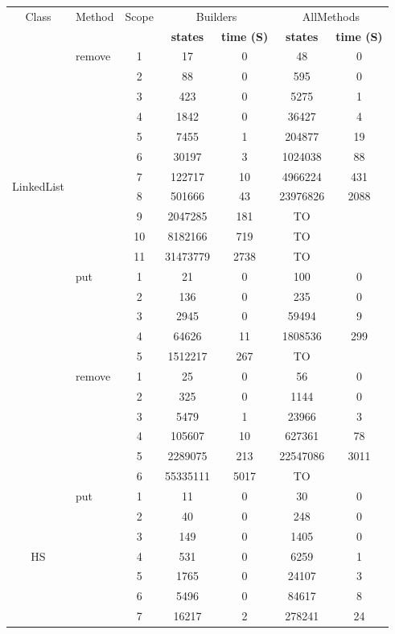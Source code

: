 \begin{table}[!thb]
\scriptsize
\begin{tabular}{ c| l| c c c c c}
\hline
Class & Method & Scope &
\multicolumn{2}{c}{\textsf{Builders}} &
\multicolumn{2}{c}{\textsf{AllMethods}} \\
&&&
\tiny{\textbf{states}} & \tiny{\textbf{time (S)}} &
\tiny{\textbf{states}} & \tiny{\textbf{time (S)} }\\
\hline
\multirow{14}{*}{LinkedList} 
& remove
  & 1 & 17  & 0 & 48  & 0 \\
& & 2 & 88  & 0 & 595 & 0 \\
& & 3 & 423 & 0 & 5275  & 1 \\
& & 4 & 1842  & 0 & 36427 & 4 \\
& & 5 & 7455  & 1 & 204877  & 19  \\
& & 6 & 30197 & 3 & 1024038 & 88  \\
& & 7 & 122717  & 10  & 4966224 & 431 \\
& & 8 & 501666  & 43  & 23976826  & 2088  \\
& & 9 & 2047285 & 181 & TO    \\
& & 10  & 8182166 & 719 &    TO  \\
& & 11  & 31473779  & 2738  &  TO     \\

\hline

\multirow{11}{*}{HM} 
& put
 & 1 & 21& 0& 100 & 0 \\
& & 2 & 136& 0& 235 & 0 \\
& & 3 & 2945& 0& 59494 & 9 \\
& & 4 & 64626& 11&  1808536& 299 \\
& & 5 & 1512217& 267& TO&  \\

 \cline{2-7}

& remove
 & 1 &25 & 0& 56 & 0 \\
& & 2 &325 & 0& 1144 &  0\\
& & 3 & 5479& 1& 23966 & 3 \\
& & 4 & 105607& 10& 627361 &  78\\
& & 5 & 2289075& 213& 22547086 &3011  \\
& & 6 & 55335111 & 5017&TO &  \\

\hline

\multirow{14}{*}{HS} 
& put
  & 1 & 11  & 0 & 30  & 0 \\
& & 2 & 40  & 0 & 248 & 0 \\
& & 3 & 149 & 0 & 1405  & 0 \\
& & 4 & 531 & 0 & 6259  & 1 \\
& & 5 & 1765  & 0 & 24107 & 3 \\
& & 6 & 5496  & 0 & 84617 & 8 \\
& & 7 & 16217 & 2 & 278241  & 24  \\



\end{tabular}
\end{table}
